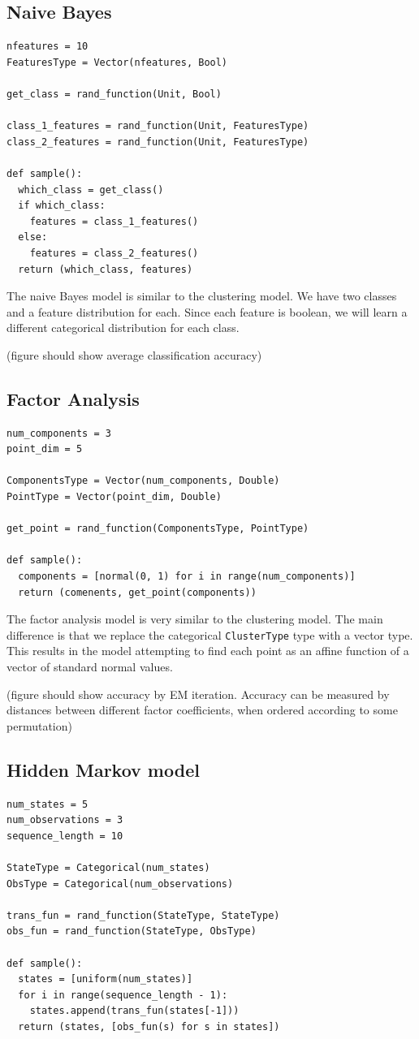\documentclass[proceed]{article}
\begin{document}
\subsection{Naive Bayes}

\begin{verbatim}
nfeatures = 10
FeaturesType = Vector(nfeatures, Bool)

get_class = rand_function(Unit, Bool)

class_1_features = rand_function(Unit, FeaturesType)
class_2_features = rand_function(Unit, FeaturesType)

def sample():
  which_class = get_class()
  if which_class:
    features = class_1_features()
  else:
    features = class_2_features()
  return (which_class, features)
\end{verbatim}

The naive Bayes model is similar to the clustering model.  We have two classes and a feature
distribution for each.  Since each feature is boolean, we will learn
a different categorical distribution for each class.

(figure should show average classification accuracy)

  \subsection{Factor Analysis}

\begin{verbatim}
num_components = 3
point_dim = 5

ComponentsType = Vector(num_components, Double)
PointType = Vector(point_dim, Double)

get_point = rand_function(ComponentsType, PointType)

def sample():
  components = [normal(0, 1) for i in range(num_components)]
  return (comenents, get_point(components))
\end{verbatim}

The factor analysis model is very similar to the clustering model.  The main difference is that we replace the categorical \texttt{ClusterType} type with a vector type.  This results in the model attempting to find each point as an affine function of a vector of standard normal values.

(figure should show accuracy by EM iteration.  Accuracy can be measured by distances between different factor coefficients, when ordered according to some permutation)
  \subsection{Hidden Markov model}
\begin{verbatim}
num_states = 5
num_observations = 3
sequence_length = 10

StateType = Categorical(num_states)
ObsType = Categorical(num_observations)

trans_fun = rand_function(StateType, StateType)
obs_fun = rand_function(StateType, ObsType)

def sample():
  states = [uniform(num_states)]
  for i in range(sequence_length - 1):
    states.append(trans_fun(states[-1]))
  return (states, [obs_fun(s) for s in states])
\end{verbatim}
\end{document}
